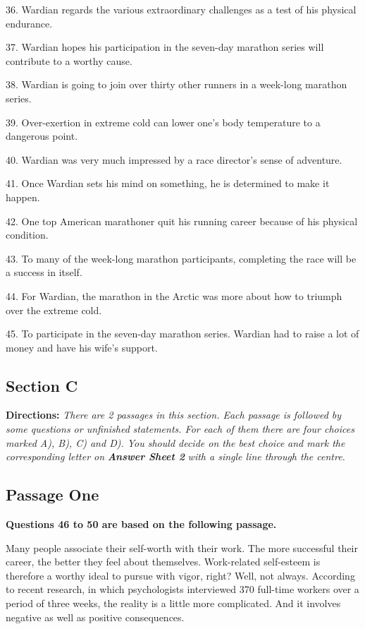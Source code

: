\documentclass[UTF8,11pt]{ctexart}
\begin{document}
36. Wardian regards the various extraordinary challenges as a test of his physical endurance.


37. Wardian hopes his participation in the seven-day marathon series will contribute to a worthy cause.


38. Wardian is going to join over thirty other runners in a week-long marathon series.


39. Over-exertion in extreme cold can lower one’s body temperature to a dangerous point.


40. Wardian was very much impressed by a race director’s sense of adventure.


41. Once Wardian sets his mind on something, he is determined to make it happen.


42. One top American marathoner quit his running career because of his physical condition.


43. To many of the week-long marathon participants, completing the race will be a success in itself.


44. For Wardian, the marathon in the Arctic was more about how to triumph over the extreme cold.


45. To participate in the seven-day marathon series. Wardian had to raise a lot of money and have his wife’s support.


\subsection*{\textbf{Section C}}


\textbf{Directions: }\textit{There are 2 passages in this section. Each passage is followed by some questions or unfinished} \textit{statements. For each of them there are four choices marked A), B), C) and D). You should decide on the best choice} \textit{and mark the corresponding letter on }\textbf{\textit{Answer Sheet 2}}\textit{ with a single line through the centre.}


\subsection*{\textbf{Passage One}}


\textbf{Questions 46 to 50 are based on the following passage.}


Many people associate their self-worth with their work. The more successful their career, the better they feel about themselves. Work-related self-esteem is therefore a worthy ideal to pursue with vigor, right? Well, not always. According to recent research, in which psychologists interviewed 370 full-time workers over a period of three weeks, the reality is a little more complicated. And it involves negative as well as positive consequences.
\end{document}
